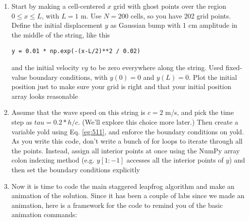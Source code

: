 \documentclass{book}
\theoremstyle{plain}
\theoremstyle{definition}
\numberwithin{exm}{chapter}
\theoremstyle{remark}
\theoremstyle{summary}
\theoremstyle{overview}
\begin{document}
\begin{enumerate}[label=(\alph*)]
\item Start by making a cell-centered $x$ grid with ghost points over the region
$0 \leq x \leq L$, with $L = 1$ m. Use $N = 200$ cells, so you have 202 grid
points. Define the initial displacement $y$ as Gaussian bump with 1 cm
amplitude in the middle of the string, like this
\begin{lstlisting}
y = 0.01 * np.exp(-(x-L/2)**2 / 0.02)
\end{lstlisting}
and the initial velocity $vy$ to be zero everywhere along the string. Used
fixed-value boundary conditions, with $y(0) = 0$ and $y(L) = 0$. Plot the
initial position just to make sure your grid is right and that your initial
position array looks reasonable
\item Assume that the wave speed on this string is $c = 2$ m/s, and pick
the time step as $tau = 0.2*h/c$. (We\rq ll explore this choice more
later.) Then create a variable yold using Eq. \eqref{eg:511}, and enforce the boundary conditions on yold. As you write this code, don\rq t write a
bunch of for loops to iterate through all the points. Instead, assign all
interior points at once using the NumPy array colon indexing method
(e.g. $y[1:-1]$ accesses all the interior points of $y$) and then set the
boundary conditions explicitly
\item Now it is time to code the main staggered leapfrog algorithm and make
an animation of the solution. Since it has been a couple of labs since
we made an animation, here is a framework for the code to remind
you of the basic animation commands:

\end{enumerate}
\end{document}
